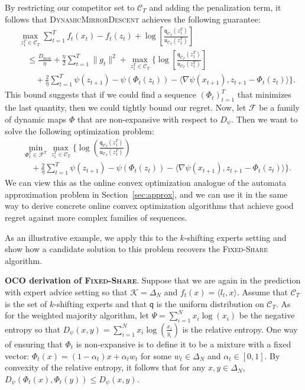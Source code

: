 \documentclass{article}
\newcommand{\sC}{\mathscr C}
\newcommand{\sfq}{{\mathsf q}}
\newcommand{\sfu}{{\mathsf u}}
\newcommand{\cC}{\mathcal C}
\newcommand{\cF}{\mathcal F}
\newcommand{\cK}{\mathcal K}
\begin{document}
By restricting our competitor set to $\sC_T$ and adding the penalization term, it follows that
\textsc{DynamicMirrorDescent} achieves the following guarantee:
\begin{align*}
  &\max_{z_1^T \in \cC_T} \sum_{t = 1}^T f_t(x_t) - f_t(z_t) + \log\left[\frac{\sfq_{\cC_T}(z_1^T)}{\sfu_{\cC_T}(z_1^T)}\right]  \\
  &\quad \leq \frac{D_{\max}}{\eta} + \frac{\eta}{2} \sum_{t = 1}^T \|g_t\|^2 + \max_{z_1^T \in \cC_T} \Bigg\{ \log\left[\frac{\sfq_{\cC_T}(z_1^T)}{\sfu_{\cC_T}(z_1^T)}\right] \\
  &\quad \quad + \frac{2}{\eta} \sum_{t = 1}^T \psi(z_{t+1}) - \psi(\Phi_t(z_t)) - \langle \nabla \psi(x_{t+1}), z_{t+1} - \Phi_t(z_t) \rangle \Bigg\}.
\end{align*}
This bound suggests that if we could find a sequence
$(\Phi_t)_{t = 1}^T$ that minimizes the last quantity, then we could
tightly bound our regret. Now, let $\cF$ be a family of dynamic maps
$\Phi$ that are non-expansive with respect to $D_\psi$.  Then we want
to solve the following optimization problem:
\begin{align}
\label{eq:doco}
  & \min_{\Phi_1^T \in \cF^T} \max_{z_1^T \in \cC_T} \Bigg\{ \log\left(\frac{\sfq_{\cC_T}(z_1^T)}{\sfu_{\cC_T}(z_1^T)}\right) \nonumber \\ 
  & \quad + \frac{2}{\eta} \sum_{t = 1}^T \psi(z_{t+1}) - \psi(\Phi_t(z_t)) - \langle \nabla \psi(x_{t+1}), z_{t+1} - \Phi_t(z_t) \rangle \Bigg\}.
\end{align}
We can view this as the online convex optimization analogue of the
automata approximation problem in Section~\ref{sec:approx}, and we
can use it in the same way to derive concrete online convex
optimization algorithms that achieve good regret against more complex
families of sequences.

As an illustrative example, we apply this to the $k$-shifting experts
setting and show how a candidate solution to this problem recovers the
\textsc{Fixed-Share} algorithm.

{\bf OCO derivation of \textsc{Fixed-Share}}.  Suppose that we are
again in the prediction with expert advice setting so that
$\cK = \Delta_N$ and $f_t(x) = \langle l_t, x \rangle$. Assume that
$\sC_T$ is the set of $k$-shifting experts and that $\sfq$ is the
uniform distribution on $\sC_T$. As for the weighted majority
algorithm, let $\Psi = \sum_{i=1}^N x_i \log(x_i)$ be the negative
entropy so that
$D_\psi(x,y) = \sum_{i=1}^N x_i \log\left(\frac{x_i}{y_i}\right)$ is
the relative entropy. One way of ensuring that $\Phi_t$ is
non-expansive is to define it to be a mixture with a fixed vector:
$\Phi_t(x) = (1-\alpha_t) x + \alpha_t w_t$ for some
$w_t \in \Delta_N$ and $\alpha_t \in [0,1]$.  By convexity of the
relative entropy, it follows that for any $x,y \in \Delta_N$,
$D_\psi(\Phi_t(x), \Phi_t(y)) \leq D_\psi(x,y)$.
\end{document}
